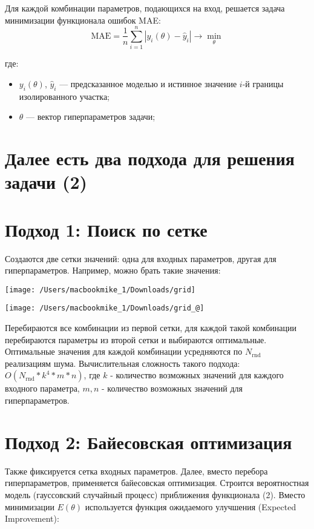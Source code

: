 \documentclass[12pt]{article}
\begin{document}
Для каждой комбинации параметров, подающихся на вход, решается задача минимизации функционала ошибок MAE:
\[
\text{MAE} = \frac{1}{n} \sum_{i=1}^{n} \left| y_i(\theta) - \hat{y}_i \right| \rightarrow \min_{\theta} \tag{2}
\]

где:
\begin{itemize}
  \item $y_i(\theta)$, $\hat{y}_i$ — предсказанное моделью и истинное значение $i$-й границы изолированного участка;
  \item $\theta$ — вектор гиперпараметров задачи;
\end{itemize}

\section*{Далее есть два подхода для решения задачи (2)}

\section*{Подход 1: Поиск по сетке}

Создаются две сетки значений: одна для входных параметров, другая для гиперпараметров. Например, можно брать такие значения:
\begin{center}
    \texttt{[image: /Users/macbookmike\_1/Downloads/grid]}
\end{center}

\begin{center}
    \texttt{[image: /Users/macbookmike\_1/Downloads/grid\_@]}
\end{center}

Перебираются все комбинации из первой сетки, для каждой такой комбинации перебираются параметры из второй сетки и выбираются оптимальные.
Оптимальные значения для каждой комбинации усредняются по $N_{\text{rnd}}$ реализациям шума. Вычислительная сложность такого подхода: $O(N_{\text{rnd}}*k^4*m*n)$, где ${k}$ - количество возможных значений для каждого входного параметра, $m, n$ - количество возможных значений для гиперпараметров.

\section*{Подход 2: Байесовская оптимизация}

Также фиксируется сетка входных параметров. Далее, вместо перебора гиперпараметров, применяется байесовская оптимизация. Строится вероятностная модель (гауссовский случайный процесс) приближения функционала (2). Вместо минимизации $E(\theta)$ используется функция ожидаемого улучшения (Expected Improvement):
\end{document}
